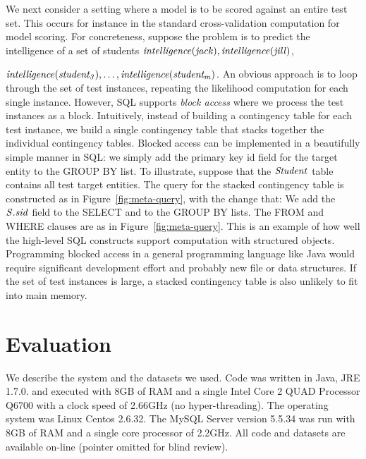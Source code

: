 \documentclass{acm_proc_article-sp}
\begin{document}
We next consider a setting where a model is to be scored against an entire test set. This occurs for instance in the standard cross-validation computation for model scoring. For concreteness, suppose the problem is to predict the intelligence of a set of students
 $\it{intelligence}(jack), \it{intelligence}(jill)$,

 $\it{intelligence}(student_{3}),\ldots, \it{intelligence}(student_{m})$.
 An obvious approach is to loop through the set of test instances, repeating the likelihood computation for each single instance. However, SQL supports {\em block access} where we process the test instances as a block. Intuitively, instead of building a contingency table for each test instance, we build a single contingency table that stacks together the individual contingency tables. Blocked access can be implemented in a beautifully simple manner in SQL: we simply add the primary key id field for the target entity to the GROUP BY list. To illustrate,  suppose that the $\it{Student}$ table contains all test target entities. The query for the stacked contingency table is constructed as in Figure~\ref{fig:meta-query}, with the change that: We add the $\it{S.sid}$ field to the SELECT and to the GROUP BY lists. The FROM and WHERE clauses are as in Figure~\ref{fig:meta-query}. This is an example of how well the high-level SQL constructs support computation with structured objects. Programming blocked access in a general programming language like Java would require significant development effort and probably new file or data structures. If the set of test instances is large, a stacked contingency table is also unlikely to fit into main memory.


\section{Evaluation} 
We describe the system and the datasets we used.
Code was written in Java, JRE 1.7.0.  and executed with 8GB of RAM and a single Intel Core 2 QUAD Processor Q6700 with a clock speed of 2.66GHz (no hyper-threading). The operating system was Linux Centos 2.6.32. 
The MySQL Server version 5.5.34 was run with 8GB of RAM and a single core processor of 2.2GHz. 
All code and datasets are available on-line (pointer omitted for blind review). 
\end{document}
